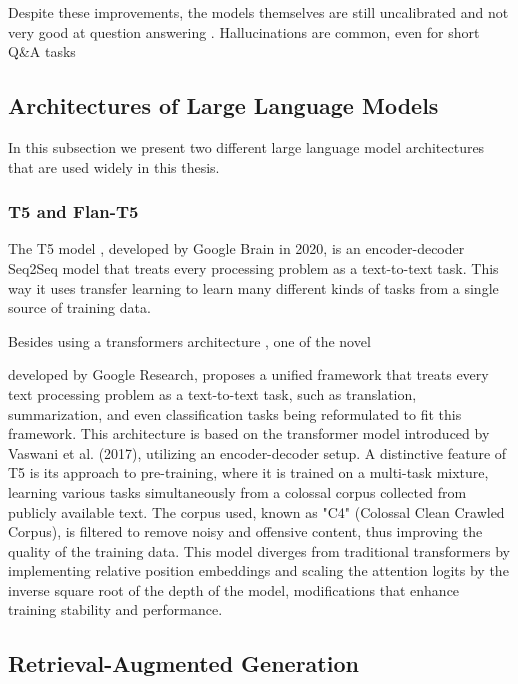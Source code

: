 Despite these improvements, the models themselves are still uncalibrated and not very good at question answering \citep{how_can_we_know}.
Hallucinations are common, even for short Q\&A tasks

\subsection{Architectures of Large Language Models}
\label{llm_architectures}

In this subsection we present two different large language model architectures that are used widely in this thesis.

\subsubsection{T5 and Flan-T5}

The T5 model \citep{t5}, developed by Google Brain in 2020, is an encoder-decoder Seq2Seq model that treats every processing problem as a text-to-text task.
This way it uses transfer learning to learn many different kinds of tasks from a single source of training data.

Besides using a transformers architecture \citep{attention_is_all_you_need}, one of the novel 

developed by Google Research, proposes a unified framework that treats every text processing problem as a text-to-text task, such as translation, summarization, and even classification tasks being reformulated to fit this framework. This architecture is based on the transformer model introduced by Vaswani et al. (2017), utilizing an encoder-decoder setup. A distinctive feature of T5 is its approach to pre-training, where it is trained on a multi-task mixture, learning various tasks simultaneously from a colossal corpus collected from publicly available text. The corpus used, known as "C4" (Colossal Clean Crawled Corpus), is filtered to remove noisy and offensive content, thus improving the quality of the training data. This model diverges from traditional transformers by implementing relative position embeddings and scaling the attention logits by the inverse square root of the depth of the model, modifications that enhance training stability and performance.

\subsection{Retrieval-Augmented Generation}

